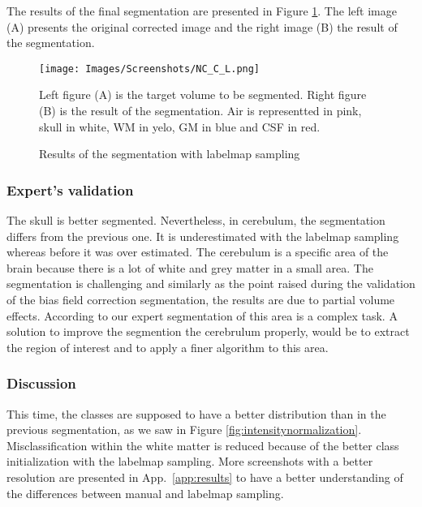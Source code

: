 The results of the final segmentation are presented in Figure \ref{fig:NC_C_L}. The left image (A) presents the original corrected image and the right image (B) the result of the segmentation. 

  \begin{figure}\centering
  \texttt{[image: Images/Screenshots/NC\_C\_L.png]}
  \caption{Results of the segmentation with labelmap sampling}{Left figure (A) is the target volume to be segmented. Right figure (B) is the result of the segmentation. Air is representted in pink, skull in white, WM in yelo, GM in blue and CSF in red.}\label{fig:NC_C_L}
  \end{figure}
 
%
\subsubsection{Expert's validation}
The skull is better segmented. Nevertheless, in cerebulum, the segmentation differs from the previous one. It is underestimated  with the labelmap sampling whereas before it was over estimated. The cerebulum is a specific area of the brain because there is a lot of white and grey matter in a small area. The segmentation is challenging and similarly as the point raised during the validation of the bias field correction segmentation, the results are due to partial volume effects. According to our expert segmentation of this area is a complex task. A solution to improve the segmention the cerebrulum properly, would be to extract the region of interest and to apply a finer algorithm to this area.

\subsubsection{Discussion}
%
This time, the classes are supposed to have a better distribution than in the previous segmentation, as we saw in Figure \ref{fig:intensitynormalization}. Misclassification within the white matter is reduced because of the better class initialization with the labelmap sampling. More screenshots with a better resolution are presented in App.~\ref{app:results} to have a better understanding of the differences between manual and labelmap sampling.

%
%

%

